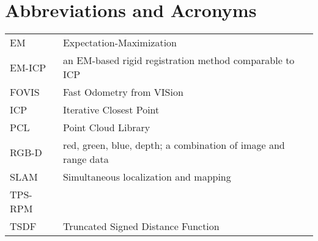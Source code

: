 \chapter*{Abbreviations and Acronyms}


\noindent
\begin{longtable}{@{}p{}p{}@{}}
        EM & Expectation-Maximization \\
    EM-ICP & an EM-based rigid registration method comparable to ICP \\
     FOVIS & Fast Odometry from VISion \\
       ICP & Iterative Closest Point \\
       PCL & Point Cloud Library \\
     RGB-D & red, green, blue, depth; a combination of image and range data \\
      SLAM & Simultaneous localization and mapping \\
   TPS-RPM & \\
      TSDF & Truncated Signed Distance Function \\
\end{longtable}

